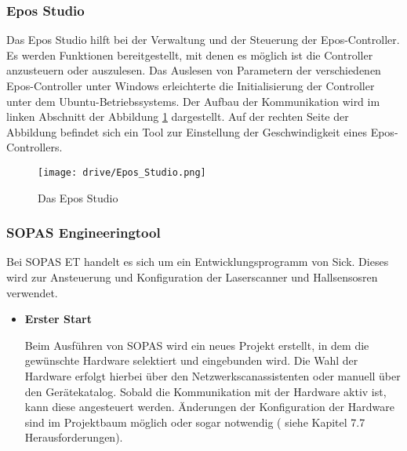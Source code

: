 \subsubsection{Epos Studio}

Das Epos Studio hilft bei der Verwaltung und der Steuerung der Epos-Controller. Es werden Funktionen bereitgestellt, mit denen es möglich ist die Controller anzusteuern oder auszulesen. Das Auslesen von Parametern der verschiedenen Epos-Controller unter Windows erleichterte die Initialisierung der Controller unter dem Ubuntu-Betriebssystems. Der Aufbau der Kommunikation wird im linken Abschnitt der Abbildung \ref{fig:Epos} dargestellt. Auf der rechten Seite der Abbildung befindet sich ein Tool zur Einstellung der Geschwindigkeit eines Epos-Controllers.

\begin{figure}[h!]
 \centering
		\texttt{[image: drive/Epos\_Studio.png]}
	\caption{Das Epos Studio}
	\label{fig:Epos}
\end{figure}

\subsubsection{SOPAS Engineeringtool}

Bei SOPAS ET handelt es sich um ein Entwicklungsprogramm von Sick. Dieses wird zur Ansteuerung und Konfiguration der Laserscanner und Hallsensosren verwendet.

\begin{itemize}
\item \textbf{ Erster Start }

Beim Ausführen von SOPAS wird ein neues Projekt erstellt, in dem die gewünschte Hardware selektiert und eingebunden wird. Die Wahl der Hardware erfolgt hierbei über den Netzwerkscanassistenten oder manuell über den Gerätekatalog. Sobald die Kommunikation mit der Hardware aktiv ist, kann diese angesteuert werden. Änderungen der Konfiguration der Hardware sind im Projektbaum möglich oder sogar notwendig ( siehe Kapitel 7.7 Herausforderungen).
\end{itemize}
